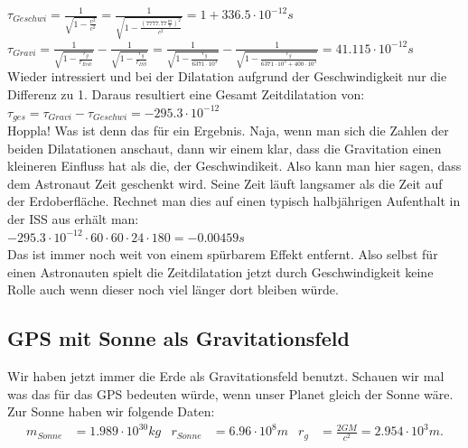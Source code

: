\begin{refsection}
\( \tau_{Geschwi} =  \frac{1}{\sqrt{1 - \frac{v^2}{c^2}}} = \frac{1}{\sqrt{1 - \frac{( 7777.77\frac{m}{s})^2}{c^2}}} = 1 + 336.5 \cdot 10^{-12}s\) \\

\( \tau_{Gravi} = \frac{1}{\sqrt{1-\frac{r_g}{r_{Erde}}}} - \frac{1}{\sqrt{1-\frac{r_g}{r_{ISS}}}} 
= \frac{1}{\sqrt{1-\frac{r_g}{6371 \cdot 10^3}}} - \frac{1}{\sqrt{1-\frac{r_g}{6371 \cdot 10^3 + 400 \cdot 10^3}}} = 41.115 \cdot 10^{-12}s \) \\

\noindent{}Wieder intressiert und bei der Dilatation aufgrund der Geschwindigkeit nur die Differenz zu 1. Daraus resultiert eine Gesamt Zeitdilatation von:\\

\( \tau_{ges} = \tau_{Gravi} - \tau_{Geschwi} = -295.3 \cdot 10^{-12} \) \\

\noindent{}Hoppla! Was ist denn das für ein Ergebnis. Naja, wenn man sich die Zahlen der beiden Dilatationen anschaut, dann wir einem klar, dass die Gravitation einen kleineren Einfluss hat als die, der Geschwindikeit. Also kann man hier sagen, dass dem Astronaut Zeit geschenkt wird. Seine Zeit läuft langsamer als die Zeit auf der Erdoberfläche. Rechnet man dies auf einen typisch halbjährigen Aufenthalt in der ISS aus erhält man:\\

\( -295.3 \cdot 10^{-12} \cdot 60 \cdot 60 \cdot 24 \cdot 180 = -0.00459s \) \\

\noindent{}Das ist immer noch weit von einem spürbarem Effekt entfernt. Also selbst für einen Astronauten spielt die Zeitdilatation jetzt durch Geschwindigkeit keine Rolle auch wenn dieser noch viel länger dort bleiben würde.

\subsection{GPS mit Sonne als Gravitationsfeld}
Wir haben jetzt immer die Erde als Gravitationsfeld benutzt. Schauen wir mal was das für das GPS bedeuten würde, wenn unser Planet gleich der Sonne wäre. Zur Sonne haben wir folgende Daten:
\begin{align*}
 m_{Sonne} &= 1.989 \cdot 10^30kg &  r_{Sonne} &= 6.96 \cdot 10^8m & r_g &= \frac{2GM}{c^2} = 2.954 \cdot 10^3m. 
\end{align*}


\end{refsection}
